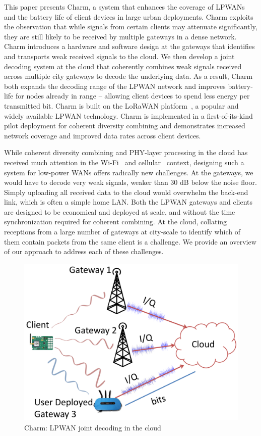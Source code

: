 This paper presents Charm, a system that enhances the coverage of LPWANs and
the battery life of client devices in large urban deployments. Charm exploits
the observation that while signals from certain clients may attenuate
significantly, they are still likely to be received by multiple gateways in a
dense network. Charm introduces a hardware and software design at the gateways
that identifies and transports weak received signals to the cloud. We then
develop a joint decoding system at the cloud that coherently combines weak
signals received across multiple city gateways to decode the underlying data.
As a result, Charm both expands the decoding range of the LPWAN network and
improves battery-life for nodes already in range -- allowing client devices to
spend less energy per transmitted bit. Charm is built on the LoRaWAN
platform~\cite{LoRaWanAlliance2015}, a popular and widely available LPWAN
technology. Charm is implemented in a first-of-its-kind pilot deployment for
coherent diversity combining and demonstrates increased network coverage and
improved data rates across client devices.

While coherent diversity combining and PHY-layer processing in the cloud has
received much attention in the Wi-Fi~\cite{tan2009sam, xie2014scalable} and
cellular~\cite{checko2015cloud, wubben2014benefits} context, designing such a
system for low-power WANs offers radically new challenges. At the gateways, we
would have to decode very weak signals, weaker than 30 dB below the noise
floor. Simply uploading all received data to the cloud would overwhelm
the back-end link, which is often  a simple home LAN. Both the LPWAN gateways
and clients are designed to be economical and deployed at scale, and without
the time synchronization required for coherent combining. At the cloud,
collating receptions from a large number of gateways at city-scale to identify
which of them contain packets from the same client is a challenge. We provide
an overview of our approach to address each of these challenges.

\begin{figure}[tb]
    \centering
    \includegraphics[width=0.60\columnwidth]{figures/LoRaRAN_cropped}
    \vspace*{-10 pt}
    \caption{Charm: LPWAN joint decoding in the cloud}
    \compactimg
    \label{fig:my_label}
\end{figure}

